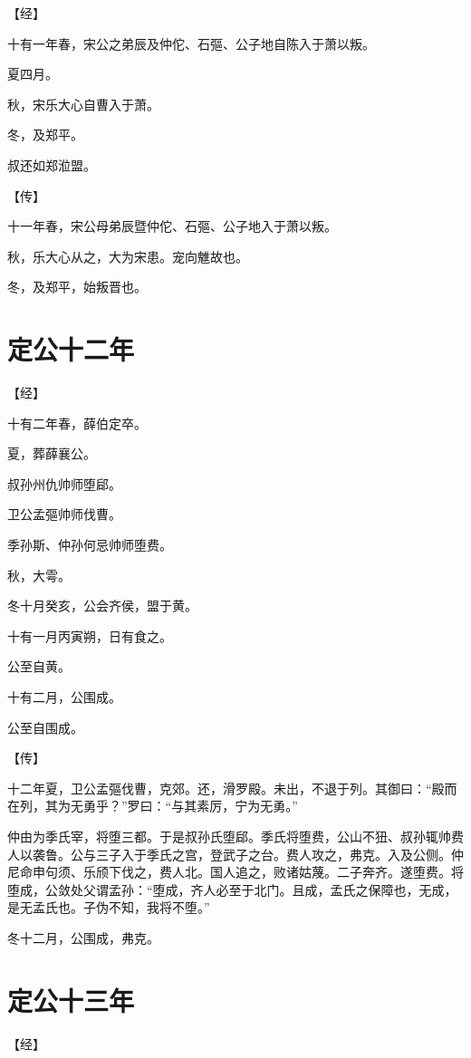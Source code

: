 \documentclass[a4paper,12pt,UTF8,twoside]{ctexbook}
\begin{document}
【经】

十有一年春，宋公之弟辰及仲佗、石彄、公子地自陈入于萧以叛。

夏四月。

秋，宋乐大心自曹入于萧。

冬，及郑平。

叔还如郑涖盟。

【传】

十一年春，宋公母弟辰暨仲佗、石彄、公子地入于萧以叛。

秋，乐大心从之，大为宋患。宠向魋故也。

冬，及郑平，始叛晋也。



\chapter{定公十二年}


【经】

十有二年春，薛伯定卒。

夏，葬薛襄公。

叔孙州仇帅师堕郈。

卫公孟彄帅师伐曹。

季孙斯、仲孙何忌帅师堕费。

秋，大雩。

冬十月癸亥，公会齐侯，盟于黄。

十有一月丙寅朔，日有食之。

公至自黄。

十有二月，公围成。

公至自围成。

【传】

十二年夏，卫公孟彄伐曹，克郊。还，滑罗殿。未出，不退于列。其御曰：“殿而在列，其为无勇乎？”罗曰：“与其素厉，宁为无勇。”

仲由为季氏宰，将堕三都。于是叔孙氏堕郈。季氏将堕费，公山不狃、叔孙辄帅费人以袭鲁。公与三子入于季氏之宫，登武子之台。费人攻之，弗克。入及公侧。仲尼命申句须、乐颀下伐之，费人北。国人追之，败诸姑蔑。二子奔齐。遂堕费。将堕成，公敛处父谓孟孙：“堕成，齐人必至于北门。且成，孟氏之保障也，无成，是无孟氏也。子伪不知，我将不堕。”

冬十二月，公围成，弗克。



\chapter{定公十三年}




【经】
\end{document}
